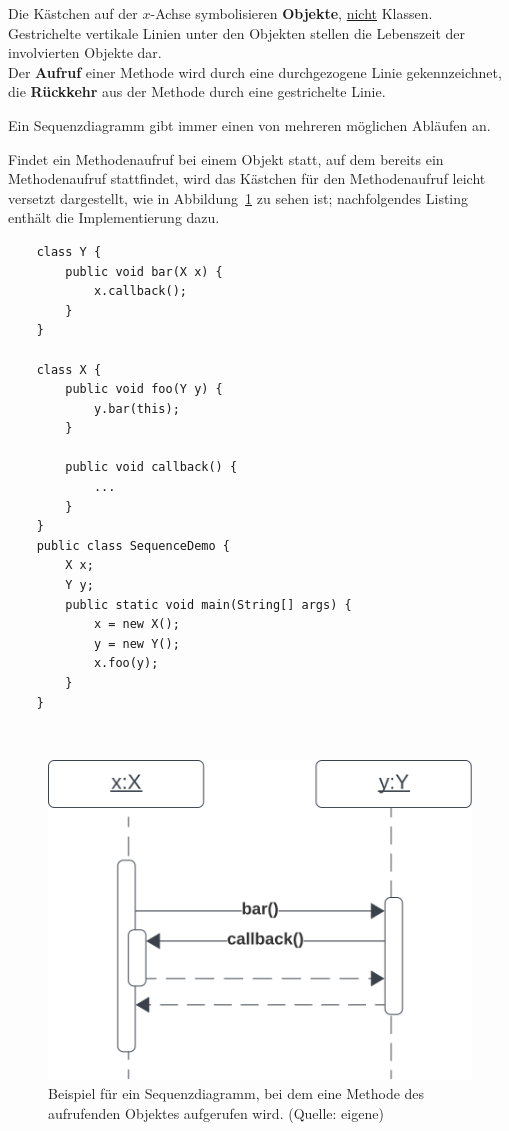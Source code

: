 \noindent
Die Kästchen auf der $x$-Achse symbolisieren \textbf{Objekte}, \ul{nicht} Klassen.\\

\noindent
Gestrichelte vertikale Linien unter den Objekten stellen die Lebenszeit der involvierten Objekte dar.\\

\noindent
Der \textbf{Aufruf} einer Methode wird durch eine durchgezogene Linie gekennzeichnet, die \textbf{Rückkehr} aus der Methode durch eine
gestrichelte Linie.

\begin{tcolorbox}[enlarge top by=0.5cm,enlarge bottom by=0.5cm]
Ein Sequenzdiagramm gibt immer einen von mehreren möglichen Abläufen an.\\
\end{tcolorbox}


\noindent
Findet ein Methodenaufruf bei einem Objekt statt, auf dem bereits ein Methodenaufruf stattfindet, wird das Kästchen für den Methodenaufruf leicht versetzt dargestellt, wie in Abbildung~\ref{fig:callback} zu sehen ist; nachfolgendes Listing enthält die Implementierung dazu.

\begin{verbatim}
    class Y {
        public void bar(X x) {
            x.callback();
        }
    }

    class X {
        public void foo(Y y) {
            y.bar(this);
        }

        public void callback() {
            ...
        }
    }
    public class SequenceDemo {
        X x;
        Y y;
        public static void main(String[] args) {
            x = new X();
            y = new Y();
            x.foo(y);
        }
    }
\end{verbatim}\\

\begin{figure}
    \centering
    \includegraphics[scale=0.5]{chapters/fopt3/img/callback}
    \caption{Beispiel für ein Sequenzdiagramm, bei dem eine Methode des aufrufenden Objektes aufgerufen wird. (Quelle: eigene)}
    \label{fig:callback}
\end{figure}

